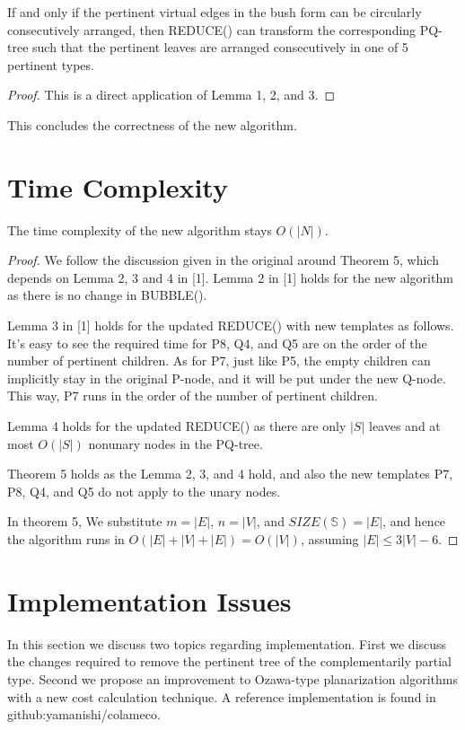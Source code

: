 \documentclass[a4]{jgaa-art}
\begin{document}
\begin{theorem}
   If and only if the pertinent virtual edges in the bush form can be circularly consecutively arranged,
   then REDUCE() can transform the corresponding PQ-tree such that the pertinent
   leaves are arranged consecutively in one of 5 pertinent types.
\end{theorem}
\begin{proof}
   This is a direct application of Lemma 1, 2, and 3.
\end{proof}

This concludes the correctness of the new algorithm.

\section{Time Complexity}\label{se:complexity}

\begin{theorem}
   The time complexity of the new algorithm stays $O(|N|)$.
\end{theorem}
\begin{proof}
   We follow the discussion given in the original \cite{BL76} around
   Theorem 5, which depends on Lemma 2, 3 and 4 in [1].
   Lemma 2 in [1] holds for the new algorithm as there is no change in BUBBLE().

   Lemma 3 in [1] holds for the updated REDUCE() with new templates as follows.
   It's easy to see the required time for P8, Q4, and Q5 are on the order
   of the number of pertinent children. As for P7, just like P5, the empty children
   can implicitly stay in the original P-node, and it will be put under
   the new Q-node. This way, P7 runs in the order of the number of
   pertinent children.

   Lemma 4 holds for the updated REDUCE() as there are only $|S|$ leaves
   and at most $O(|S|)$ nonunary nodes in the PQ-tree.

   Theorem 5 holds as the Lemma 2, 3, and 4 hold, and also
   the new templates P7, P8, Q4, and Q5 do not apply to the unary nodes.

   In theorem 5, We substitute $m=|E|$, $n=|V|$, and $SIZE(\mathbb{S})=|E|$, and hence 
   the algorithm runs in $O(|E|+|V|+|E|) = O(|V|)$, assuming $|E| \le 3|V| -6$.
\end{proof}

\section{Implementation Issues}\label{se:implementation}
In this section we discuss two topics regarding implementation.
First we discuss the changes required to remove the pertinent tree of the complementarily partial
type. Second we propose an improvement to Ozawa-type planarization algorithms with a new
cost calculation technique.
A reference implementation is found in github:yamanishi/colameco.
\end{document}
